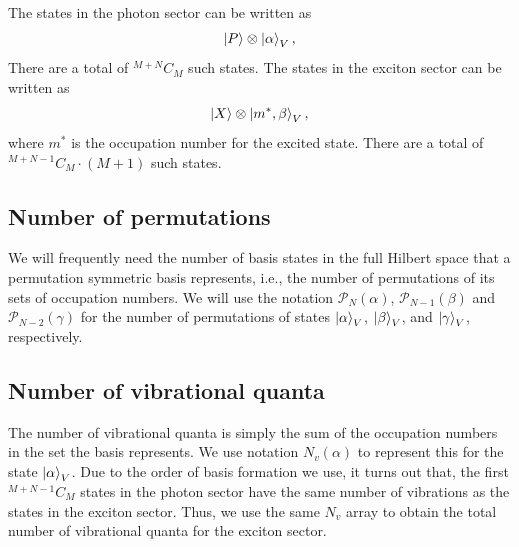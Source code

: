 \documentclass[final,twocolumn]{elsarticle}
\newcommand{\cntset}{\mathcal{P}_N}
\newcommand{\cntsetx}{\mathcal{P}_{N-1}}
\newcommand{\cntsetxx}{\mathcal{P}_{N-2}}
\begin{document}
\begin{small}
The states in the photon sector can be written as
\begin{gather}\nonumber
\ket{P}\otimes\ket{\alpha}_V,
\end{gather}
There are a total of
${}^{M+N}C_{M}$ such states.
The states in the exciton sector can be written as
\begin{gather}\nonumber
\ket{X}\otimes\ket{m^\ast,\beta}_V,
\end{gather}
where $m^\ast$ is the occupation number for the excited state.
There are a total of
${}^{M+N-1}C_{M}\cdot(M+1)$ such states.

\subsection{Number of permutations}

We will frequently need the number of basis states 
in the full Hilbert space that a permutation symmetric basis
represents, i.e., the number of permutations of its sets of occupation numbers.
We will use the notation
$\cntset(\alpha)$, $\cntsetx(\beta)$ and $\cntsetxx(\gamma)$ for 
the number of permutations of states
$\ket{\alpha}_V$, $\ket{\beta}_V$, and $\ket{\gamma}_V$,
respectively.

\subsection{Number of vibrational quanta}
The number of vibrational quanta is simply the sum of the occupation numbers in the set the basis represents.
We use notation $N_v(\alpha)$ to represent this for the state 
$\ket{\alpha}_V$.
Due to the order of basis formation we use,
it turns out that, the first 
${}^{M+N-1}C_{M}$ states in the photon sector
have the same number of vibrations as the states in the exciton sector. Thus, we use the same $N_v$ array to obtain
the total number of vibrational quanta for the exciton sector.







\end{small}
\end{document}
